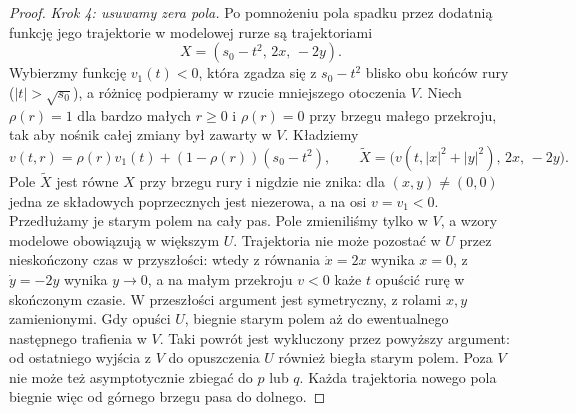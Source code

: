 \begin{proof}
\emph{Krok 4: usuwamy zera pola.}
Po pomnożeniu pola spadku przez
dodatnią funkcję jego trajektorie
w modelowej rurze są trajektoriami
\[
 X=(s_0-t^2,\,2x,\,-2y).
\]
Wybierzmy funkcję $v_1(t)<0$,
która zgadza się z $s_0-t^2$
blisko obu końców rury
($|t|>\sqrt{s_0}$), a różnicę podpieramy
w rzucie mniejszego otoczenia $V$. Niech
$\rho(r)=1$ dla bardzo małych
$r\geq0$ i $\rho(r)=0$ przy
brzegu małego przekroju, tak aby nośnik całej
zmiany był zawarty w $V$. Kładziemy
\[
 v(t,r)=\rho(r)v_1(t)
       +(1-\rho(r))(s_0-t^2),\qquad
 \widetilde X=
 \bigl(v(t,|x|^2+|y|^2),\,2x,\,-2y\bigr).
\]
Pole $\widetilde X$ jest równe $X$
przy brzegu rury i nigdzie nie
znika: dla $(x,y)\ne(0,0)$ jedna
ze składowych poprzecznych jest
niezerowa, a na osi $v=v_1<0$.
Przedłużamy je starym polem na cały pas.
Pole zmieniliśmy tylko w $V$, a wzory modelowe
obowiązują w większym $U$. Trajektoria nie może
pozostać w $U$ przez nieskończony czas
w przyszłości: wtedy z równania
$\dot x=2x$ wynika $x=0$,
z $\dot y=-2y$ wynika $y\to0$,
a na małym przekroju $v<0$
każe $t$ opuścić rurę w skończonym
czasie. W przeszłości argument
jest symetryczny, z rolami $x,y$
zamienionymi. Gdy opuści $U$, biegnie starym polem
aż do ewentualnego następnego trafienia w $V$.
Taki powrót jest wykluczony przez powyższy argument:
od ostatniego wyjścia z $V$ do opuszczenia $U$
również biegła starym polem. Poza $V$ nie może
też asymptotycznie zbiegać do $p$ lub $q$.
Każda trajektoria nowego pola biegnie więc od górnego
brzegu pasa do dolnego.


\end{proof}
